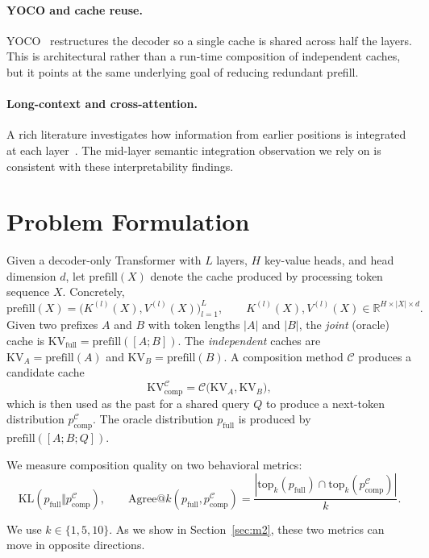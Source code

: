 \paragraph{YOCO and cache reuse.} YOCO~\citep{sun2024yoco} restructures the decoder so a single cache is shared across half the layers. This is architectural rather than a run-time composition of independent caches, but it points at the same underlying goal of reducing redundant prefill.

\paragraph{Long-context and cross-attention.} A rich literature investigates how information from earlier positions is integrated at each layer~\citep{elhage2022superposition,olah2022attention}. The mid-layer semantic integration observation we rely on is consistent with these interpretability findings.

\section{Problem Formulation}

Given a decoder-only Transformer with $L$ layers, $H$ key-value heads, and head dimension $d$, let $\mathrm{prefill}(X)$ denote the cache produced by processing token sequence $X$. Concretely,
\[
\mathrm{prefill}(X) = \bigl( K^{(l)}(X), V^{(l)}(X) \bigr)_{l=1}^L,
\qquad
K^{(l)}(X), V^{(l)}(X) \in \mathbb{R}^{H \times |X| \times d}.
\]
Given two prefixes $A$ and $B$ with token lengths $|A|$ and $|B|$, the \emph{joint} (oracle) cache is
$\mathrm{KV}_{\text{full}} = \mathrm{prefill}([A;B])$. The \emph{independent} caches are $\mathrm{KV}_A = \mathrm{prefill}(A)$ and $\mathrm{KV}_B = \mathrm{prefill}(B)$. A composition method $\mathcal{C}$ produces a candidate cache
\[
\mathrm{KV}_{\text{comp}}^{\mathcal{C}} = \mathcal{C}\bigl( \mathrm{KV}_A, \mathrm{KV}_B \bigr),
\]
which is then used as the past for a shared query $Q$ to produce a next-token distribution $p_{\text{comp}}^{\mathcal{C}}$. The oracle distribution $p_{\text{full}}$ is produced by $\mathrm{prefill}([A;B;Q])$.

We measure composition quality on two behavioral metrics:
\[
\mathrm{KL}(p_{\text{full}} \Vert p_{\text{comp}}^{\mathcal{C}}),
\qquad
\mathrm{Agree@}k(p_{\text{full}}, p_{\text{comp}}^{\mathcal{C}})
= \frac{|\mathrm{top}_k(p_{\text{full}}) \cap \mathrm{top}_k(p_{\text{comp}}^{\mathcal{C}})|}{k}.
\]

We use $k \in \{1, 5, 10\}$. As we show in Section~\ref{sec:m2}, these two metrics can move in opposite directions.

